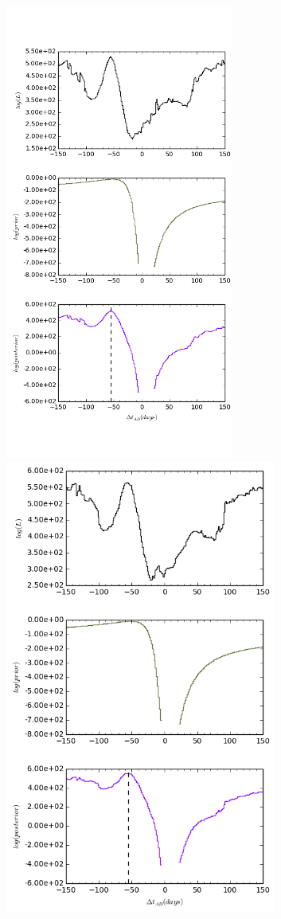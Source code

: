 \documentclass[\docopts]{\docclass}
\begin{document}
\begin{figure}[!h]
  \centering
  \begin{minipage}[bottom]{0.4\textwidth}
\includegraphics[width=\textwidth, height=15cm, keepaspectratio]{whiten1/data1_full_log.png}
  \end{minipage}
  \hfill
  \begin{minipage}[bottom]{0.4\textwidth}
\includegraphics[width=\textwidth, height=15cm, keepaspectratio]{whiten2/data1_full_log.png}

\end{minipage}
\end{figure}
\end{document}

